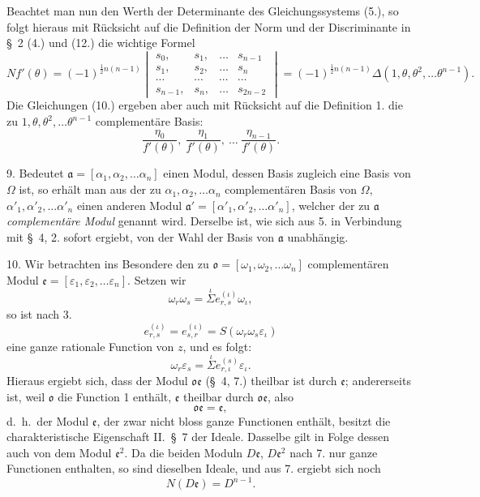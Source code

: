 \documentclass{article}
\begin{document}
Beachtet man nun den Werth der Determinante des Gleichungssystems (5.), so folgt hieraus mit Rücksicht auf die Definition der Norm und der Discriminante in §~2 (4.) und (12.) die wichtige Formel
\[ Nf'(\theta) = (-1)^{\frac{1}{2}n(n-1)} \begin{vmatrix} s_{0}, & s_{1}, & \ldots & s_{n-1} \\ s_{1}, & s_{2}, & \ldots & s_{n} \\ \cdots & \cdots & \cdots & \cdots \\ s_{n-1}, & s_{n}, & \ldots & s_{2n-2} \end{vmatrix} = (-1)^{\frac{1}{2}n(n-1)}\Delta(1, \theta, \theta^{2}, \ldots \theta^{n-1}). \tag{11.} \]
Die Gleichungen (10.) ergeben aber auch mit Rücksicht auf die Definition 1. die zu $1, \theta, \theta^{2}, \ldots \theta^{n-1}$ complementäre Basis:
\[ \frac{\eta_{0}}{f'(\theta)}, \ \frac{\eta_{1}}{f'(\theta)}, \ \ldots \ \frac{\eta_{n-1}}{f'(\theta)}. \]

9. Bedeutet $\mathfrak{a} = [\alpha_{1}, \alpha_{2}, \ldots \alpha_{n}]$ einen Modul, dessen Basis zugleich eine Basis von $\Omega$ ist, so erhält man aus der zu $\alpha_{1}, \alpha_{2}, \ldots \alpha_{n}$ complementären Basis von $\Omega$, $\alpha'_{1}, \alpha'_{2}, \ldots \alpha'_{n}$ einen anderen Modul $\mathfrak{a}' = [\alpha'_{1}, \alpha'_{2}, \ldots \alpha'_{n}]$, welcher der zu $\mathfrak{a}$ \emph{complementäre Modul} genannt wird. Derselbe ist, wie sich aus 5. in Verbindung mit §~4, 2. sofort ergiebt, von der Wahl der Basis von $\mathfrak{a}$ unabhängig.

10. Wir betrachten ins Besondere den zu $\mathfrak{o} = [\omega_{1}, \omega_{2}, \ldots \omega_{n}]$ complementären Modul $\mathfrak{e} = [\varepsilon_{1}, \varepsilon_{2}, \ldots \varepsilon_{n}]$. Setzen wir
\[ \omega_{r}\omega_{s} = \overset{\iota}{\Sigma} e_{r,s}^{(\iota)}\omega_{\iota}, \]
so ist nach 3.
\[ e_{r,s}^{(\iota)} = e_{s,r}^{(\iota)} = S(\omega_{r}\omega_{s}\varepsilon_{\iota}) \]
eine ganze rationale Function von $z$, und es folgt:
\[ \omega_{r}\varepsilon_{s} = \overset{\iota}{\Sigma} e_{r,\iota}^{(s)}\varepsilon_{\iota}. \]
Hieraus ergiebt sich, dass der Modul $\mathfrak{o}\mathfrak{e}$ (§~4, 7.) theilbar ist durch $\mathfrak{e}$; andererseits ist, weil $\mathfrak{o}$ die Function 1 enthält, $\mathfrak{e}$ theilbar durch $\mathfrak{o}\mathfrak{e}$, also
\[ \mathfrak{o}\mathfrak{e} = \mathfrak{e}, \]
d.\ h.\ der Modul $\mathfrak{e}$, der zwar nicht bloss ganze Functionen enthält, besitzt die charakteristische Eigenschaft II.\ §~7 der Ideale. Dasselbe gilt in Folge dessen auch von dem Modul $\mathfrak{e}^{2}$. Da die beiden Moduln $D\mathfrak{e}$, $D\mathfrak{e}^{2}$ nach 7. nur ganze Functionen enthalten, so sind dieselben Ideale, und aus 7. ergiebt sich noch
\[ N(D\mathfrak{e}) = D^{n-1}. \]
\end{document}
